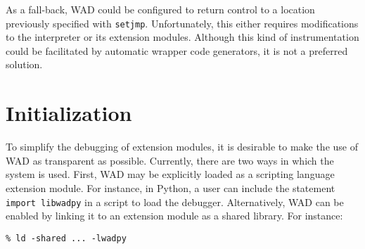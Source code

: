 
As a fall-back, WAD could be configured to return control to a location
previously specified with {\tt setjmp}.  Unfortunately, this either
requires modifications to the interpreter or its extension modules.
Although this kind of instrumentation could be facilitated by automatic
wrapper code generators, it is not a preferred solution.

\section{Initialization}

To simplify the debugging of extension modules, it
is desirable to make the use of WAD as transparent as possible.
Currently, there are two ways in which the system is used.  First, WAD
may be explicitly loaded as a scripting language extension module.
For instance, in Python, a user can include the statement {\tt import
libwadpy} in a script to load the debugger.  Alternatively, WAD can be
enabled by linking it to an extension module as a shared
library.  For instance:

\begin{verbatim}
% ld -shared ... -lwadpy
\end{verbatim}

